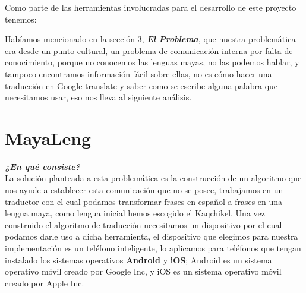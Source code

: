 \documentclass[a4paper,openright,11pt]{article}
\begin{document}
Como parte de las herramientas involucradas para el desarrollo de este proyecto tenemos:\\
\begin{table}[H]
	\begin{center}
	\end{center}
	\caption{Tecnologías Involucradas}
\end{table}


Habíamos mencionado en la sección 3, \textbf{\textit{El Problema}}, que nuestra problemática era desde un punto cultural, un problema de comunicación interna por falta de conocimiento, porque no conocemos las lenguas mayas, no las podemos hablar, y tampoco encontramos información fácil sobre ellas, no es cómo hacer una traducción en Google translate y saber como se escribe alguna palabra que necesitamos usar, eso nos lleva al siguiente análisis. \\

\newpage

\section{MayaLeng}
\textbf{\textit{¿En qué consiste?}}\\
La solución planteada a esta problemática es la construcción de un algoritmo que nos ayude a establecer esta comunicación que no se posee, trabajamos en un traductor con el cual podamos transformar frases en español a frases en una lengua maya, como lengua inicial hemos escogido el Kaqchikel. Una vez construido el algoritmo de traducción necesitamos un dispositivo por el cual podamos darle uso a dicha herramienta, el dispositivo que elegimos para nuestra implementación es un teléfono inteligente, lo aplicamos para teléfonos que tengan instalado los sistemas operativos \textbf{Android} y \textbf{iOS}; Android es un sistema operativo móvil creado por Google Inc, y iOS es un sistema operativo móvil creado por Apple Inc.\\
\end{document}
